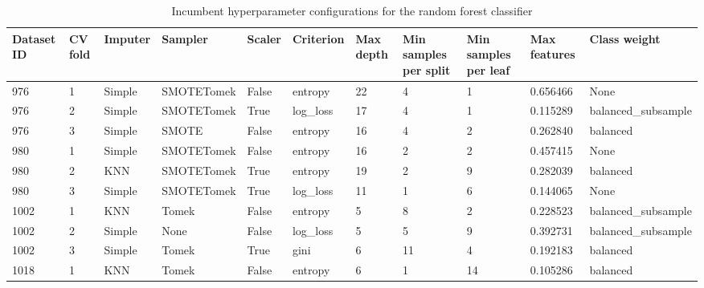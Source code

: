 \documentclass[11pt]{article}
\begin{document}
\begin{table}
\footnotesize
\caption{Incumbent hyperparameter configurations for the random forest classifier}
\center
\begin{tabularx}{22cm}{lllllllXXXX}
\toprule
Dataset ID & CV fold & Imputer &    Sampler & Scaler & Criterion & Max depth & Min samples \newline per split & Min samples \newline per leaf &  Max features &       Class weight \\
\midrule
       976 &       1 &  Simple & SMOTETomek &  False &   entropy &        22 &                     4 &                    1 &      0.656466 &               None \\
       976 &       2 &  Simple & SMOTETomek &   True &  log\_loss &        17 &                     4 &                    1 &      0.115289 & balanced\_subsample \\
       976 &       3 &  Simple &      SMOTE &  False &   entropy &        16 &                     4 &                    2 &      0.262840 &           balanced \\
\midrule
       980 &       1 &  Simple & SMOTETomek &  False &   entropy &        16 &                     2 &                    2 &      0.457415 &               None \\
       980 &       2 &     KNN & SMOTETomek &   True &   entropy &        19 &                     2 &                    9 &      0.282039 &           balanced \\
       980 &       3 &  Simple & SMOTETomek &   True &  log\_loss &        11 &                     1 &                    6 &      0.144065 &               None \\
\midrule
      1002 &       1 &     KNN &      Tomek &  False &   entropy &         5 &                     8 &                    2 &      0.228523 & balanced\_subsample \\
      1002 &       2 &  Simple &       None &  False &  log\_loss &         5 &                     5 &                    9 &      0.392731 & balanced\_subsample \\
      1002 &       3 &  Simple &      Tomek &   True &      gini &         6 &                    11 &                    4 &      0.192183 &           balanced \\
\midrule
      1018 &       1 &     KNN &      Tomek &  False &   entropy &         6 &                     1 &                   14 &      0.105286 &           balanced \\

\end{tabularx}
\end{table}
\end{document}
